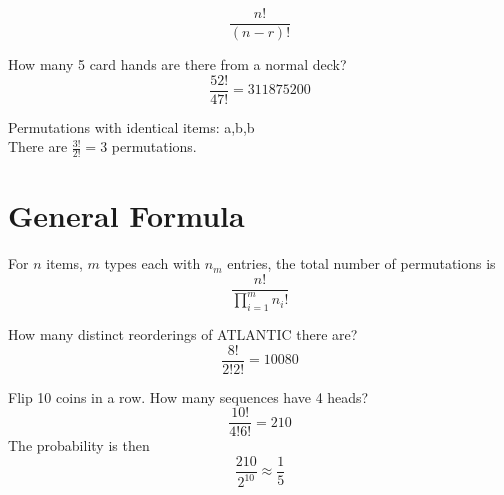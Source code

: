 \documentclass[12pt]{article}
\begin{document}
$$\frac{n!}{(n-r)!}$$

\begin{ex}
	How many 5 card hands are there from a normal deck?
	$$\frac{52!}{47!} = 311875200$$
\end{ex}

\begin{ex}
	Permutations with identical items: {a,b,b} \\
	There are $\frac{3!}{2!} = 3$ permutations.
\end{ex}

\section{General Formula}
For $n$ items, $m$ types each with $n_m$ entries, the total number of permutations is
$$\frac{n!}{\prod_{i=1}^m n_i!}$$

\begin{ex}
	How many distinct reorderings of ATLANTIC there are?
	$$\frac{8!}{2!2!} = 10080$$
\end{ex}

\begin{ex}
	Flip 10 coins in a row. How many sequences have 4 heads?
	$$\frac{10!}{4!6!} = 210$$
	The probability is then
	$$\frac{210}{2^{10}} \approx \frac{1}{5}$$
\end{ex}
\end{document}
